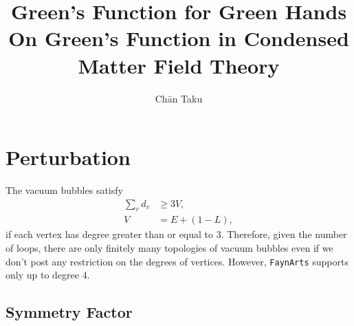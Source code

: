 \documentclass{article}
\title{Green's Function for Green Hands\\
\large On Green's Function in Condensed Matter Field Theory}
\author{Ch\=an Taku}
\begin{document}
\maketitle

\section{Perturbation}

The vacuum bubbles satisfy
\begin{align*}
    \sum_v d_v &\ge 3V, \\
    V &= E + (1-L),
\end{align*}
if each vertex has degree greater than or equal to $3$.
Therefore, given the number of loops, there are only finitely many topologies of vacuum bubbles even if we don't post any restriction on the degrees of vertices.
However, \texttt{FaynArts} supports only up to degree $4$.

\subsection{Symmetry Factor}
\end{document}
